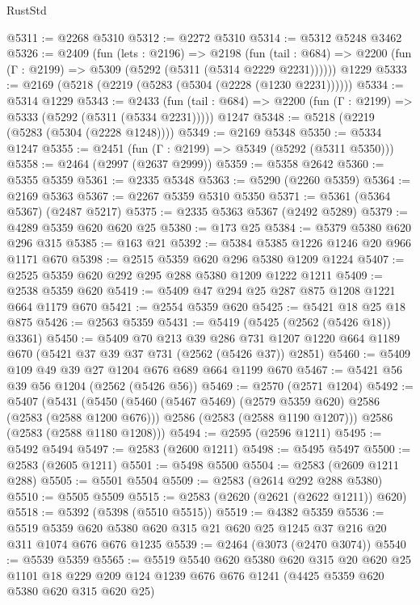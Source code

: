 \begin{lexlean}{RustStd}
\begin{coremodule}
{\begin{coremodule}
{{{{{{{{{{{{{{{@5311 := @2268 @5310
@5312 := @2272 @5310
@5314 := @5312 @5248 @3462
@5326 := @2409
    (fun (lets : @2196) =>
    @2198
      (fun (tail : @684) => @2200 (fun (Γ : @2199) => @5309 (@5292 (@5311 (@5314 @2229 @2231))))))
    @1229
@5333 := @2169 (@5218 (@2219 (@5283 (@5304 (@2228 (@1230 @2231))))))
@5334 := @5314 @1229
@5343 := @2433
    (fun (tail : @684) => @2200 (fun (Γ : @2199) => @5333 (@5292 (@5311 (@5334 @2231)))))
    @1247
@5348 := @5218 (@2219 (@5283 (@5304 (@2228 @1248))))
@5349 := @2169 @5348
@5350 := @5334 @1247
@5355 := @2451 (fun (Γ : @2199) => @5349 (@5292 (@5311 @5350)))
@5358 := @2464 (@2997 (@2637 @2999))
@5359 := @5358 @2642
@5360 := @5355 @5359
@5361 := @2335 @5348
@5363 := @5290 (@2260 @5359)
@5364 := @2169 @5363
@5367 := @2267 @5359 @5310 @5350
@5371 := @5361 (@5364 @5367) (@2487 @5217)
@5375 := @2335 @5363 @5367 (@2492 @5289)
@5379 := @4289 @5359 @620 @620 @25
@5380 := @173 @25
@5384 := @5379 @5380 @620 @296 @315
@5385 := @163 @21
@5392 := @5384 @5385 @1226 @1246 @20 @966 @1171 @670
@5398 := @2515 @5359 @620 @296 @5380 @1209 @1224
@5407 := @2525 @5359 @620 @292 @295 @288 @5380 @1209 @1222 @1211
@5409 := @2538 @5359 @620
@5419 := @5409 @47 @294 @25 @287 @875 @1208 @1221 @664 @1179 @670
@5421 := @2554 @5359 @620
@5425 := @5421 @18 @25 @18 @875
@5426 := @2563 @5359
@5431 := @5419 (@5425 (@2562 (@5426 @18)) @3361)
@5450 := @5409
    @70
    @213
    @39
    @286
    @731
    @1207
    @1220
    @664
    @1189
    @670
    (@5421 @37 @39 @37 @731 (@2562 (@5426 @37)) @2851)
@5460 := @5409 @109 @49 @39 @27 @1204 @676 @689 @664 @1199 @670
@5467 := @5421 @56 @39 @56 @1204 (@2562 (@5426 @56))
@5469 := @2570 (@2571 @1204)
@5492 := @5407
    (@5431
      (@5450
        (@5460 (@5467 @5469) (@2579 @5359 @620) @2586 (@2583 (@2588 @1200 @676)))
        @2586
        (@2583 (@2588 @1190 @1207)))
      @2586
      (@2583 (@2588 @1180 @1208)))
@5494 := @2595 (@2596 @1211)
@5495 := @5492 @5494
@5497 := @2583 (@2600 @1211)
@5498 := @5495 @5497
@5500 := @2583 (@2605 @1211)
@5501 := @5498 @5500
@5504 := @2583 (@2609 @1211 @288)
@5505 := @5501 @5504
@5509 := @2583 (@2614 @292 @288 @5380)
@5510 := @5505 @5509
@5515 := @2583 (@2620 (@2621 (@2622 @1211)) @620)
@5518 := @5392 (@5398 (@5510 @5515))
@5519 := @4382 @5359
@5536 := @5519 @5359 @620 @5380 @620 @315 @21 @620 @25 @1245 @37 @216 @20 @311 @1074 @676 @676 @1235
@5539 := @2464 (@3073 (@2470 @3074))
@5540 := @5539 @5359
@5565 := @5519
    @5540
    @620
    @5380
    @620
    @315
    @20
    @620
    @25
    @1101
    @18
    @229
    @209
    @124
    @1239
    @676
    @676
    @1241
    (@4425 @5359 @620 @5380 @620 @315 @620 @25)
}}}}}}}}}}}}}}}
\end{coremodule}}
\end{coremodule}
\end{lexlean}
